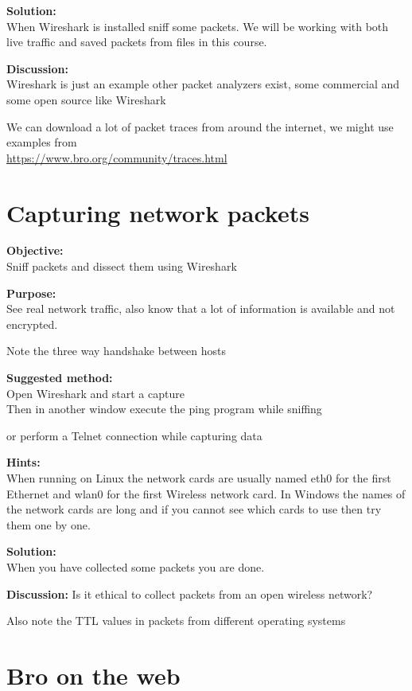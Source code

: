 \documentclass[a4paper,11pt,notitlepage]{report}
\begin{document}
{\bf Solution:}\\
When Wireshark is installed sniff some packets. We will be working with both live traffic and saved packets from files in this course.

{\bf Discussion:}\\
Wireshark is just an example other packet analyzers exist, some commercial and some open source like Wireshark

We can download a lot of packet traces from around the internet, we might use examples from\\
\url{https://www.bro.org/community/traces.html}

\chapter{Capturing network packets}
\label{ex:wireshark-capture}



{\bf Objective:}\\
Sniff packets and dissect them using Wireshark

{\bf Purpose:}\\
See real network traffic, also know that a lot of information is available and not encrypted.

Note the three way handshake between hosts

{\bf Suggested method:}\\
Open Wireshark and start a capture\\
Then in another window execute the ping program while sniffing

or perform a Telnet connection while capturing data

{\bf Hints:}\\
When running on Linux the network cards are usually named eth0 for the first Ethernet and wlan0 for the first Wireless network card. In Windows the names of the network cards are long and if you cannot see which cards to use then try them one by one.

{\bf Solution:}\\
When you have collected some packets you are done.

{\bf Discussion:}
Is it ethical to collect packets from an open wireless network?

Also note the TTL values in packets from different operating systems




\chapter{Bro on the web}
\label{ex:broweb}
\end{document}
